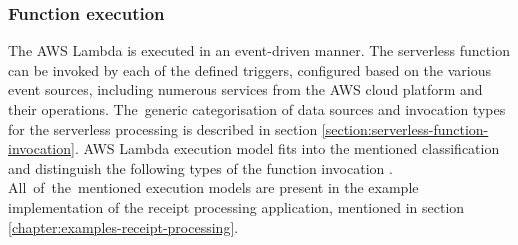 \subsubsection{Function execution} \label{chapter:lambda-function-execution-model}

The AWS Lambda is executed in an event-driven manner. 
The serverless function can be invoked by each of the defined triggers, configured based on the various event sources, including numerous services from the AWS cloud platform and their operations. 
The~generic categorisation of data sources and invocation types for the serverless processing is described in section \ref{section:serverless-function-invocation}. 
AWS Lambda execution model fits into the mentioned classification and distinguish the following types of the function invocation \cite{OptimiseYourServerlessApplications}.
All~of~the~mentioned execution models are present in the example implementation of the receipt processing application, mentioned in section \ref{chapter:examples-receipt-processing}.


